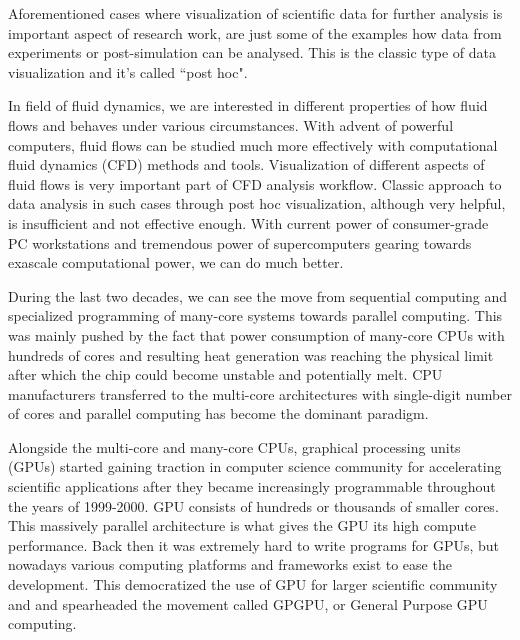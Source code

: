 Aforementioned cases where visualization of scientific data for further analysis is important aspect of research work, are just some of the examples how data from experiments or post-simulation can be analysed. This is the classic type of data visualization and it's called ``post hoc".

In field of fluid dynamics, we are interested in different properties of how fluid flows and behaves under various circumstances. With advent of powerful computers, fluid flows can be studied much more effectively with computational fluid dynamics (CFD) methods and tools. Visualization of different aspects of fluid flows is very important part of CFD analysis workflow. Classic approach to data analysis in such cases through post hoc visualization, although very helpful, is insufficient and not effective enough. With current power of consumer-grade PC workstations and tremendous power of supercomputers gearing towards exascale computational power, we can do much better.

During the last two decades, we can see the move from sequential computing and specialized programming of many-core systems towards parallel computing. This was mainly pushed by the fact that power consumption of many-core CPUs with hundreds of cores and resulting heat generation was reaching the physical limit after which the chip could become unstable and potentially melt. CPU manufacturers transferred to the multi-core architectures with single-digit number of cores and parallel computing has become the dominant paradigm.

Alongside the multi-core and many-core CPUs, graphical processing units (GPUs) started gaining traction in computer science community for accelerating scientific applications after they became increasingly programmable throughout the years of 1999-2000. GPU consists of hundreds or thousands of smaller cores. This massively parallel architecture is what gives the GPU its high compute performance. Back then it was extremely hard to write programs for GPUs, but nowadays various computing platforms and frameworks exist to ease the development. This democratized the use of GPU for larger scientific community and and spearheaded the movement called GPGPU, or General Purpose GPU computing.

